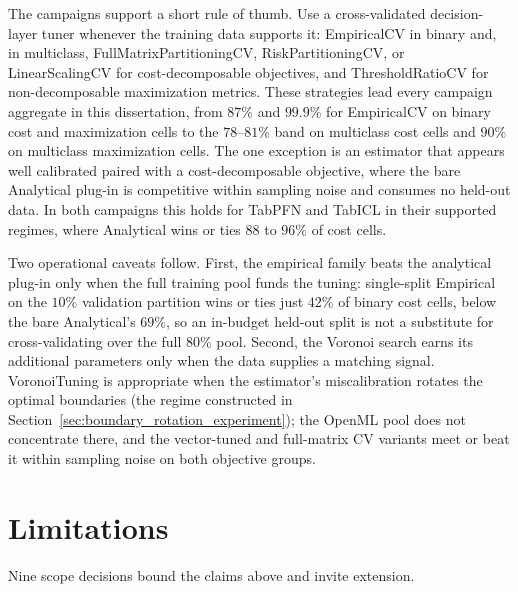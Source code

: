The campaigns support a short rule of thumb. Use a cross-validated decision-layer tuner whenever the training data supports it: EmpiricalCV in binary and, in multiclass, FullMatrixPartitioningCV, RiskPartitioningCV, or LinearScalingCV for cost-decomposable objectives, and ThresholdRatioCV for non-decomposable maximization metrics. These strategies lead every campaign aggregate in this dissertation, from $87\%$ and $99.9\%$ for EmpiricalCV on binary cost and maximization cells to the $78$--$81\%$ band on multiclass cost cells and $90\%$ on multiclass maximization cells. The one exception is an estimator that appears well calibrated paired with a cost-decomposable objective, where the bare Analytical plug-in is competitive within sampling noise and consumes no held-out data. In both campaigns this holds for TabPFN and TabICL in their supported regimes, where Analytical wins or ties $88$ to $96\%$ of cost cells.

Two operational caveats follow. First, the empirical family beats the analytical plug-in only when the full training pool funds the tuning: single-split Empirical on the $10\%$ validation partition wins or ties just $42\%$ of binary cost cells, below the bare Analytical's $69\%$, so an in-budget held-out split is not a substitute for cross-validating over the full $80\%$ pool. Second, the Voronoi search earns its additional parameters only when the data supplies a matching signal. VoronoiTuning is appropriate when the estimator's miscalibration rotates the optimal boundaries (the regime constructed in Section~\ref{sec:boundary_rotation_experiment}); the OpenML pool does not concentrate there, and the vector-tuned and full-matrix CV variants meet or beat it within sampling noise on both objective groups.

\section{Limitations}

Nine scope decisions bound the claims above and invite extension.

